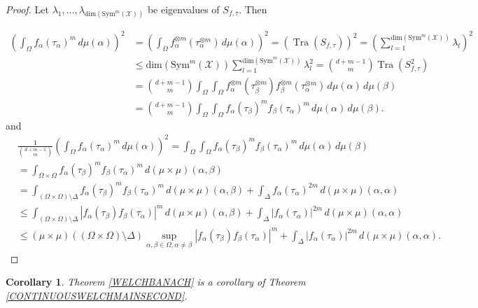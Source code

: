 \documentclass{amsart}
\newtheorem{corollary}[theorem] {Corollary}
\begin{document}
 \begin{proof}
Let $\lambda_1, \dots, \lambda_{\text{dim}(\text{Sym}^m(\mathcal{X}))}$ be eigenvalues of $	S_{f, \tau}$. Then 

\begin{align*}
	\left(\int_{\Omega}
	f_\alpha(\tau_\alpha)^m\, d \mu(\alpha)\right)^2	&=\left(\int_{\Omega}
	f_\alpha^{\otimes m}(\tau_\alpha^{\otimes m})\, d \mu(\alpha)\right)^2=	(\operatorname{Tra}(S_{f,\tau}))^2=\left(\sum_{l=1}^{\text{dim}(\text{Sym}^m(\mathcal{X}))}
	\lambda_l\right)^2\\
	&\leq 
	\text{dim}(\text{Sym}^m(\mathcal{X})) \sum_{l=1}^{\text{dim}(\text{Sym}^m(\mathcal{X}))}
	\lambda_l^2
	={d+m-1 \choose m}\operatorname{Tra}(S^2_{f,\tau})\\
	&={d+m-1 \choose m}\int_{\Omega}\int_{\Omega}f_\alpha^{\otimes m}(\tau_\beta^{\otimes m})f_\beta^{\otimes m}(\tau_\alpha^{\otimes m})\, d \mu(\alpha)\, d \mu(\beta)
	\\
	&={d+m-1 \choose m}\int_{\Omega}\int_{\Omega}f_\alpha(\tau_\beta)^mf_\beta(\tau_\alpha)^m\, d \mu(\alpha)\, d \mu(\beta).
\end{align*} 	
and 
 \begin{align*}
	&\frac{1}{{d+m-1 \choose m}}  \left(\int_{\Omega}
	f_\alpha(\tau_\alpha)^m\, d \mu(\alpha)\right)^2=\int_{\Omega}\int_{\Omega}f_\alpha(\tau_\beta)^mf_\beta(\tau_\alpha)^m\, d \mu(\alpha)\, d \mu(\beta)\\
	&=	\int_{\Omega\times\Omega}f_\alpha(\tau_\beta)^mf_\beta(\tau_\alpha)^m\, d(\mu\times\mu)(\alpha,\beta)\\
	&=\int_{(\Omega\times\Omega)\setminus \Delta}f_\alpha(\tau_\beta)^mf_\beta(\tau_\alpha)^m\, d(\mu\times\mu)(\alpha,\beta)+\int_{\Delta}f_\alpha(\tau_\alpha)^{2m}\, d(\mu\times\mu)(\alpha,\alpha)\\
	&\leq \int_{(\Omega\times\Omega)\setminus \Delta}|f_\alpha(\tau_\beta)f_\beta(\tau_\alpha)|^m\, d(\mu\times\mu)(\alpha,\beta)+\int_{\Delta}|f_\alpha(\tau_\alpha)|^{2m}\, d(\mu\times\mu)(\alpha,\alpha)\\
	&\leq (\mu\times\mu)((\Omega\times\Omega)\setminus\Delta) 	\sup _{\alpha, \beta \in \Omega, \alpha\neq \beta}|f_\alpha(\tau_\beta)f_\beta(\tau_\alpha)|^m+\int_{\Delta}|f_\alpha(\tau_\alpha)|^{2m}\, d(\mu\times\mu)(\alpha,\alpha).
\end{align*}
 \end{proof}
 \begin{corollary}
  	Theorem  \ref{WELCHBANACH}    is a corollary of Theorem 	\ref{CONTINUOUSWELCHMAINSECOND}.
  \end{corollary}
\end{document}
